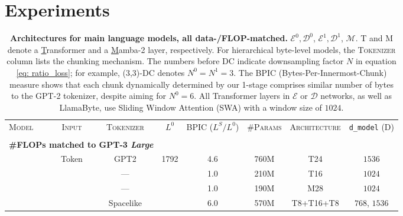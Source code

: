 \documentclass{article}
\newcommand{\onestage}{1-stage}
\theoremstyle{plain}
\theoremstyle{remark}
\begin{document}
\section{Experiments}
\label{sec: experiments}

\begin{table}[t!]
\caption{
\textbf{Architectures for main language models, all data-/FLOP-matched.} \colorbox{EncDec0}{$\mathcal{E}^0,\mathcal{D}^0$}, \colorbox{EncDec1}{$\mathcal{E}^1,\mathcal{D}^1$}, \colorbox{Main}{$\mathcal{M}$}.
T and M denote a \underline{T}ransformer and a \underline{M}amba-2 layer, respectively.
For hierarchical byte-level models, the \textsc{Tokenizer} column lists the chunking mechanism.
The numbers before DC indicate downsampling factor $N$ in equation \eqref{eq: ratio_loss}; for example, (3,3)-DC denotes $N^0=N^1=3$.
The BPIC (Bytes-Per-Innermost-Chunk) measure shows that each chunk dynamically determined by our \onestage{} comprises similar number of bytes to the GPT-2 tokenizer, despite aiming for $N^0=6$.
All Transformer layers in $\mathcal{E}$ or $\mathcal{D}$ networks, as well as LlamaByte, use Sliding Window Attention (SWA) with a window size of $1024$.
}
\centering
\small
\resizebox{\linewidth}{!}
{ 
\begin{tabular}{lccccccc} 
\toprule
\multirow{2}{*}{\textsc{Model}} & \multirow{2}{*}{\textsc{Input}} & \multirow{2}{*}{\textsc{Tokenizer}} & \multirow{2}{*}{$L^0$} & \multirowcell{2}{\textsc{BPIC}\\($L^S / L^0$)} & \multirow{2}{*}{\textsc{\#Params}} & \multirow{2}{*}{\textsc{Architecture}} & \multirow{2}{*}{\texttt{d\_model} (D)}\\
\\
\midrule
\multicolumn{3}{l}{\quad \textbf{\#FLOPs matched to GPT-3 \textit{Large}}}\\
\cellcolor{Gray7!20}{Transformer} & {Token} & {GPT2} & {1792} & 4.6 & 760M & \colorbox{Main}{T24} & \colorbox{Main}{$1536$}\\
\addlinespace[-0.15em]
\cmidrule{1-8}
\addlinespace[-0.25em]
\cellcolor{Grape7!10}{LlamaByte} & & --- & & 1.0 & 210M & \colorbox{Main}{T16} & \colorbox{Main}{$1024$}\\
\cellcolor{Blue7!10}{MambaByte} & & --- & & 1.0 & 190M & \colorbox{Main}{M28} & \colorbox{Main}{$1024$}\\
\cellcolor{Cyan7!10}{SpaceByte} & & Spacelike & & 6.0 & 570M & \colorbox{EncDec0}{T8}+\colorbox{Main}{T16}+\colorbox{EncDec0}{T8} & \colorbox{EncDec0}{$768$}, \colorbox{Main}{$1536$}\\

\end{tabular}}
\end{table}
\end{document}
